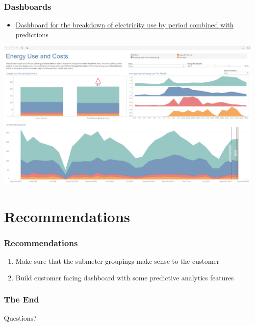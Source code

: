 \documentclass[10pt]{beamer}
\begin{document}
\begin{frame}
\frametitle{Dashboards}

\begin{itemize}
    \item
        \href{https://eu-west-1a.online.tableau.com/\#/site/tuomokareoja/views/EnergyUseandCosts/EnergyUseandCosts/}{Dashboard for the breakdown of electricity use by period combined with predictions}
\end{itemize}

{
    \centering
        \includegraphics[width=\textwidth,height=\textheight,keepaspectratio]{tableau_demo.png}
    \par
}

\end{frame}


\section{Recommendations}


\begin{frame}
\frametitle{Recommendations}

\begin{enumerate}
    \item Make sure that the submeter groupings make sense to the customer
    \item Build customer facing dashboard with some predictive analytics features
\end{enumerate}

\end{frame}

\begin{frame}
\frametitle{The End}

\LARGE{\centerline{Questions?}}

\end{frame}

\end{document}
